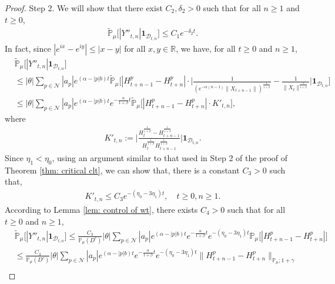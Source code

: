 \documentclass[12pt,a4paper]{amsart}
\theoremstyle{plain}
\theoremstyle{definition}
\numberwithin{equation}{section}
\begin{document}
\begin{proof}
  Step 2.
  We will show that there exist $C_2,\delta_2 > 0$ such that for all $n\geq 1$ and $t\geq 0$,
  \begin{align}
    \label{thm12211}
    \mathbb{\widetilde{P}}_{\mu}\big[|Y''_{t,n}|\mathbf{1}_{\mathcal{D}_{t,n}}\big]
    \leq C_1e^{-\delta_2 t}.
  \end{align}
  In fact, since $|e^{ix}-e^{iy}|\leq|x-y|$ for all $x,y\in \mathbb R$, we have, for all $t \geq 0$ and $n\geq 1$,
  \begin{align}
    \label{large: used next}
    & \widetilde{\mathbb{P}}_{\mu}\big[|Y''_{t,n}|\mathbf{1}_{\mathcal{D}_{t,n}}\big]\\
    & \leq |\theta|\sum_{p\in\mathcal{N}}|a_p|e^{(\alpha-|p|b)t}\widetilde{\mathbb{P}}_{\mu}\Big[|H_{t+n-1}^p-H_{t+n}^p|\cdot\Big|\frac{1}{(e^{-\alpha(n-1)}\|X_{t+n-1}\|)^{\frac{1}{1+\beta}}}-\frac{1}{\|X_t\|^{\frac{1}{1+\beta}}}\Big|\mathbf{1}_{\mathcal{D}_{t,n}}\Big]\\
    & \leq |\theta| \sum_{p\in\mathcal{N}} |a_p| e^{(\alpha-|p|b)t}e^{-\frac{\alpha}{1+\beta}t}\widetilde{\mathbb{P}}_{\mu}\Big[|H_{t+n-1}^p-H_{t+n}^p|\cdot K'_{t,n}\Big],
  \end{align}
  where
  \begin{align}
    K'_{t,n}
    := \Big| \frac{ H_t^{ \frac { 1 } { 1 + \beta } } - H_{ t + n - 1 }^{ \frac { 1 }{ 1 + \beta } } } { H_t^{ \frac{ 1 }{ 1 + \beta }} H_{t+n-1}^{\frac{1}{1+\beta}}}\Big|\mathbf{1}_{\mathcal{D}_{t,n}}.
  \end{align}
	Since $\eta_1 < \eta_0$, using an argument similar to that used in Step 2 of the proof of Theorem \ref{thm: critical clt}, we can show that, there is a constant $C_3> 0$ such that,
  \begin{align}
    \label{ineq: control of Kkt1}
    K'_{t,n}
    \leq C_3 e^{-(\eta_0 - 3\eta_1) t},
    \quad t \geq 0, n\geq 1.
  \end{align}
  According to Lemma \ref{lem: control of wt}, there exists $C_4>0$ such that for all $t\geq 0$ and $n\geq 1$,
  \begin{align}
    \label{ineq:used next 2}
    & \widetilde{\mathbb{P}}_{\mu}\big[|Y''_{t,n}|\mathbf{1}_{\mathcal{D}_{t,n}}\big]
      \leq \frac{C_3}{\mathbb{P}_{\mu}(D^c)} |\theta| \sum_{ p \in \mathcal{N} } |a_p| e^{ ( \alpha - |p| b ) t } e^{ - \frac{ \alpha } { 1 + \beta } t } e^{ - ( \eta_0 - 3 \eta_1 ) t } \mathbb{ P }_{ \mu } \Big[ | H_{t+n-1}^p - H_{t+n}^p | \Big]\\
    & \leq \frac{ C_3 }{ \mathbb{P}_{ \mu }( D^c ) } |\theta| \sum_{p\in\mathcal{N}}| a_p | e^{(\alpha-|p|b)t} e^{ - \frac{ \alpha } { 1 + \beta } t } e^{ - ( \eta_0 - 3 \eta_1 ) t } \| H_{ t + n - 1 }^p - H_{ t + n}^p \|_{ \mathbb{ P }_{ \mu }; 1 + \gamma} \\

\end{align}
\end{proof}
\end{document}
